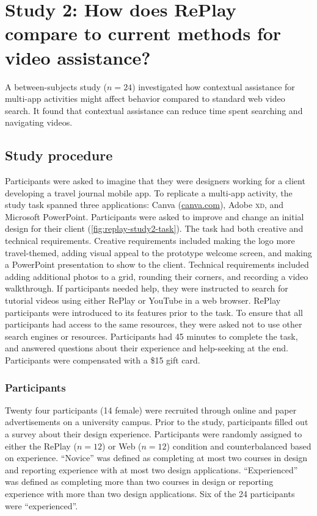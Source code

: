 \section{Study 2: How does RePlay compare to current methods for video assistance?}

A between-subjects study ($n\!=\!24$) investigated how contextual assistance for multi-app activities might affect behavior compared to standard web video search. It found that contextual assistance can reduce time spent searching and navigating videos.

\subsection{Study procedure}
Participants were asked to imagine that they were designers working for a client developing a travel journal mobile app. To replicate a multi-app activity, the study task spanned three applications: Canva (\url{canva.com}), Adobe \textsc{xd}, and Microsoft PowerPoint. Participants were asked to improve and change an initial design for their client (\autoref{fig:replay-study2-task}). The task had both creative and technical requirements. Creative requirements included making the logo more travel-themed, adding visual appeal to the prototype welcome screen, and making a PowerPoint presentation to show to the client. Technical requirements included adding additional photos to a grid, rounding their corners, and recording a video walkthrough. If participants needed help, they were instructed to search for tutorial videos using either RePlay or YouTube in a web browser. RePlay participants were introduced to its features prior to the task. To ensure that all participants had access to the same resources, they were asked not to use other search engines or resources. Participants had 45 minutes to complete the task, and answered questions about their experience and help-seeking at the end. Participants were compensated with a \$15 gift card.

\subsubsection{Participants}
Twenty four participants (14 female) were recruited through online and paper advertisements on a university campus. Prior to the study, participants filled out a survey about their design experience. Participants were randomly assigned to either the RePlay ($n\!=\!12$) or Web ($n\!=\!12$) condition and counterbalanced based on experience. ``Novice'' was defined as completing at most two courses in design and reporting experience with at most two design applications. ``Experienced'' was defined as completing more than two courses in design or reporting experience with more than two design applications. Six of the 24 participants were ``experienced''. 

